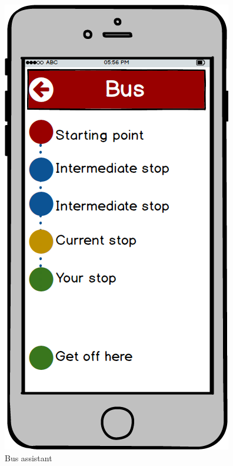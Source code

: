 \begin{figure}[!htb]
\begin{minipage}[b]{0.3\textwidth}
	\includegraphics[scale=0.3]{images/bus}
	\caption{Bus assistant}
	\label{ref:bus}
\end{minipage}
\end{figure}

